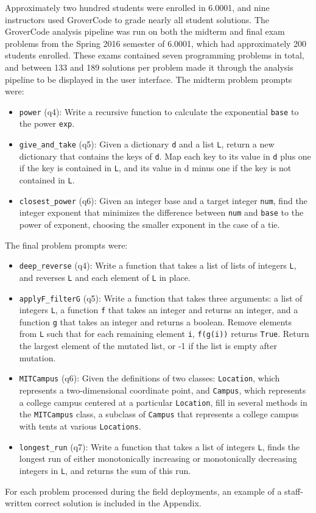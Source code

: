 Approximately two hundred students were enrolled in 6.0001, and nine instructors used GroverCode to grade nearly all student solutions. %
The GroverCode analysis pipeline was run on both the midterm and final exam problems from the Spring 2016 semester of 6.0001, which had approximately 200 students enrolled. These exams contained seven programming problems in total, and between 133 and 189 solutions per problem made it through the analysis pipeline to be displayed in the user interface. The midterm problem prompts were:
\begin{itemize}
\item \texttt{power} (q4): Write a recursive function to calculate the exponential \texttt{base} to the power \texttt{exp}.
\item \texttt{give\_and\_take} (q5): Given a dictionary \texttt{d} and a list \texttt{L}, return a new dictionary that contains the keys of \texttt{d}. Map each key to its value in \texttt{d} plus one if the key is contained in \texttt{L}, and its value in d minus one if the key is not contained in \texttt{L}.
\item \texttt{closest\_power} (q6): Given an integer base and a target integer \texttt{num}, find the integer exponent that minimizes the difference between \texttt{num} and \texttt{base} to the power of exponent, choosing the smaller exponent in the case of a tie.
\end{itemize}
The final problem prompts were:
\begin{itemize}
\item \texttt{deep\_reverse} (q4): Write a function that takes a list of lists of integers \texttt{L}, and reverses \texttt{L} and each element of \texttt{L} in place.
\item \texttt{applyF\_filterG} (q5): Write a function that takes three arguments: a list of integers \texttt{L}, a function \texttt{f} that takes an integer and returns an integer, and a function \texttt{g} that takes an integer and returns a boolean. Remove elements from \texttt{L} such that for each remaining element \texttt{i}, \texttt{f(g(i))} returns \texttt{True}. Return the largest element of the mutated list, or -1 if the list is empty after mutation.
\item \texttt{MITCampus} (q6): Given the definitions of two classes: \texttt{Location}, which represents a two-dimensional coordinate point, and \texttt{Campus}, which represents a college campus centered at a particular \texttt{Location}, fill in several methods in the \texttt{MITCampus} class, a subclass of \texttt{Campus} that represents a college campus with tents at various \texttt{Locations}.
\item \texttt{longest\_run} (q7): Write a function that takes a list of integers \texttt{L}, finds the longest run of either monotonically increasing or monotonically decreasing integers in \texttt{L}, and returns the sum of this run.
\end{itemize}
For each problem processed during the field deployments, an example of a staff-written correct solution is included in the Appendix.

